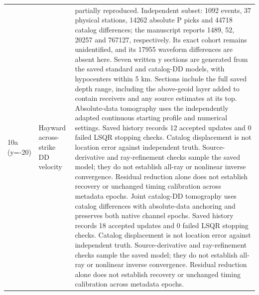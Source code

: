 \begin{longtable}{>{\raggedright\arraybackslash}p{}>{\raggedright\arraybackslash}p{}>{\raggedright\arraybackslash}p{}}
10a (y=-20) & Hayward across-strike DD velocity & partially reproduced. Independent subset: 1092 events, 37 physical stations, 14262 absolute P picks and 44718 catalog differences; the manuscript reports 1489, 52, 20257 and 767127, respectively. Its exact cohort remains unidentified, and its 17955 waveform differences are absent here. Seven written y sections are generated from the saved standard and catalog-DD models, with hypocenters within 5 km. Sections include the full saved depth range, including the above-geoid layer added to contain receivers and any source estimates at its top. Absolute-data tomography uses the independently adapted continuous starting profile and numerical settings. Saved history records 12 accepted updates and 0 failed LSQR stopping checks. Catalog displacement is not location error against independent truth. Source-derivative and ray-refinement checks sample the saved model; they do not establish all-ray or nonlinear inverse convergence. Residual reduction alone does not establish recovery or unchanged timing calibration across metadata epochs. Joint catalog-DD tomography uses catalog differences with absolute-data anchoring and preserves both native channel epochs. Saved history records 18 accepted updates and 0 failed LSQR stopping checks. Catalog displacement is not location error against independent truth. Source-derivative and ray-refinement checks sample the saved model; they do not establish all-ray or nonlinear inverse convergence. Residual reduction alone does not establish recovery or unchanged timing calibration across metadata epochs.\\

\end{longtable}
